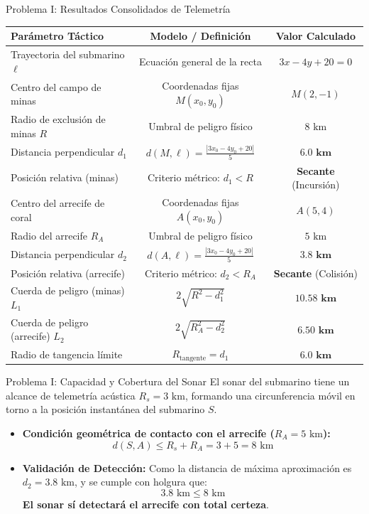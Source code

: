 \documentclass[aspectratio=169]{beamer}
\begin{document}
\begin{frame}{Problema I: Resultados Consolidados de Telemetría}
  \centering
  \small
  \begin{tabular}{|l|c|c|}
    \hline
    \textbf{Parámetro Táctico} & \textbf{Modelo / Definición} & \textbf{Valor Calculado} \\
    \hline
    Trayectoria del submarino $\ell$ & Ecuación general de la recta & $3x - 4y + 20 = 0$ \\
    Centro del campo de minas & Coordenadas fijas $M(x_0, y_0)$ & $M(2, -1)$ \\
    Radio de exclusión de minas $R$ & Umbral de peligro físico & $8\text{~km}$ \\
    Distancia perpendicular $d_1$ & $d(M, \ell) = \frac{|3x_0 - 4y_0 + 20|}{5}$ & $\mathbf{6.0\text{~km}}$ \\
    Posición relativa (minas) & Criterio métrico: $d_1 < R$ & \textbf{Secante} (Incursión) \\
    \hline
    Centro del arrecife de coral & Coordenadas fijas $A(x_0, y_0)$ & $A(5, 4)$ \\
    Radio del arrecife $R_A$ & Umbral de peligro físico & $5\text{~km}$ \\
    Distancia perpendicular $d_2$ & $d(A, \ell) = \frac{|3x_0 - 4y_0 + 20|}{5}$ & $\mathbf{3.8\text{~km}}$ \\
    Posición relativa (arrecife) & Criterio métrico: $d_2 < R_A$ & \textbf{Secante} (Colisión) \\
    \hline
    Cuerda de peligro (minas) $L_1$ & $2\sqrt{R^2 - d_1^2}$ & $\mathbf{10.58\text{~km}}$ \\
    Cuerda de peligro (arrecife) $L_2$ & $2\sqrt{R_A^2 - d_2^2}$ & $\mathbf{6.50\text{~km}}$ \\
    Radio de tangencia límite & $R_{\text{tangente}} = d_1$ & $\mathbf{6.0\text{~km}}$ \\
    \hline
  \end{tabular}
\end{frame}


\begin{frame}{Problema I: Capacidad y Cobertura del Sonar}
  El sonar del submarino tiene un alcance de telemetría acústica $R_s = 3\text{~km}$, formando una circunferencia móvil en torno a la posición instantánea del submarino $S$.
  \vspace{0.3cm}
  \begin{itemize}
    \item \textbf{Condición geométrica de contacto con el arrecife ($R_A = 5\text{~km}$):}
      \[d(S, A) \le R_s + R_A = 3 + 5 = 8\text{~km}\]
    \vspace{0.15cm}
    \item \textbf{Validación de Detección:}
      Como la distancia de máxima aproximación es $d_2 = 3.8\text{~km}$, y se cumple con holgura que:
      \[3.8\text{~km} \le 8\text{~km}\]
      \textbf{El sonar sí detectará el arrecife con total certeza}.
  \end{itemize}
\end{frame}
\end{document}
